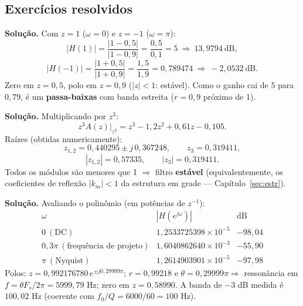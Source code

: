 \subsection*{Exercícios resolvidos}


\textbf{Solução.} Com $z=1$ ($\omega=0$) e $z=-1$ ($\omega=\pi$):
\[
  |H(1)|=\frac{|1-0{,}5|}{|1-0{,}9|}=\frac{0{,}5}{0{,}1}=5
  \ \Rightarrow\ 13{,}9794\ \text{dB},
\]
\[
  |H(-1)|=\frac{|1+0{,}5|}{|1+0{,}9|}=\frac{1{,}5}{1{,}9}=0{,}789474
  \ \Rightarrow\ -2{,}0532\ \text{dB}.
\]
Zero em $z=0{,}5$, polo em $z=0{,}9$ ($|z|<1$: estável). Como o ganho cai de
$5$ para $0{,}79$, é um \textbf{passa-baixas} com banda estreita
($r=0{,}9$ próximo de 1).



\textbf{Solução.} Multiplicando por $z^3$:
\[
  z^3A(z)\big|_{z^3}=z^3-1{,}2z^2+0{,}61z-0{,}105 .
\]
Raízes (obtidas numericamente):
\[
  z_{1,2}=0{,}440295\pm j\,0{,}367248,\qquad z_3=0{,}319411,
\]
\[
  |z_{1,2}|=0{,}57335,\qquad |z_3|=0{,}319411 .
\]
Todos os módulos são menores que 1 $\Rightarrow$ filtro \textbf{estável}
(equivalentemente, os coeficientes de reflexão $|k_m|<1$ da estrutura em
grade — Capítulo~\ref{sec:estr}).



\textbf{Solução.} Avaliando o polinômio (em potências de $z^{-1}$):
\[
  \begin{array}{c|c|c}
    \omega & |H(e^{j\omega})| & \text{dB}\\ \hline
    0\ (\text{DC})      & 1{,}2533725398\times10^{-5} & -98{,}04\\
    0{,}3\pi\ (\text{frequência de projeto}) & 1{,}6040862640\times10^{-3} & -55{,}90\\
    \pi\ (\text{Nyquist}) & 1{,}2614903901\times10^{-5} & -97{,}98
  \end{array}
\]
Polos: $z=0{,}992176780\,e^{\pm j0{,}29999\pi}$; $r=0{,}99218$ e
$\theta=0{,}29999\pi\Rightarrow$ ressonância em
$f=\theta F_s/2\pi=5999{,}79$ Hz; zero em $z=0{,}58990$. A banda de $-3$ dB
medida é $100{,}02$ Hz (coerente com $f_0/Q=6000/60=100$ Hz).

